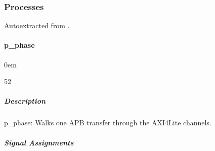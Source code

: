 \documentclass[letterpaper,10pt,english]{sphinxmanual}
\begin{document}
\subsubsection{Processes}
\label{\detokenize{modules/apb_bridge/processes/index:processes}}\label{\detokenize{modules/apb_bridge/processes/index::doc}}
\sphinxAtStartPar
Auto\sphinxhyphen{}extracted from .

\sphinxstepscope


\paragraph{p\_phase}
\label{\detokenize{modules/apb_bridge/processes/p_phase:p-phase}}\label{\detokenize{modules/apb_bridge/processes/p_phase::doc}}
\begin{DUlineblock}{0em}
\item[]  
\item[]  52
\item[]  
\item[]  
\end{DUlineblock}


\subparagraph{Description}
\label{\detokenize{modules/apb_bridge/processes/p_phase:description}}
\sphinxAtStartPar
p\_phase: Walks one APB transfer through the AXI4\sphinxhyphen{}Lite channels.


\subparagraph{Signal Assignments}
\label{\detokenize{modules/apb_bridge/processes/p_phase:signal-assignments}}
\end{document}
